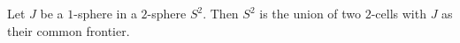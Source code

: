 Let $J$ be a $1$-sphere in a $2$-sphere $S^2$. Then $S^2$ is the union of two $2$-cells with $J$ as their common frontier.
